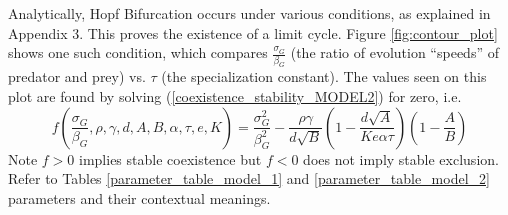 \documentclass{amsart}
\theoremstyle{definition}
\theoremstyle{remark}
\numberwithin{equation}{section}
\begin{document}
Analytically, Hopf Bifurcation occurs under various conditions, as explained in Appendix 3.  This proves the existence of a limit cycle.  Figure \ref{fig:contour_plot} shows one such condition, which compares $\frac{\sigma_G}{\beta_G}$ (the ratio of evolution ``speeds'' of predator and prey) vs. $\tau$ (the specialization constant).  The values seen on this plot are found by solving (\ref{coexistence_stability_MODEL2}) for zero, i.e.
\begin{equation}
	f\left(\frac{\sigma_G}{\beta_G}, \rho, \gamma, d, A, B, \alpha, \tau, e, K\right) = \frac{\sigma_G^2}{\beta_G^2} - \frac{\rho\gamma}{d\sqrt{B}}\left(1 - \frac{d\sqrt{A}}{Ke\alpha\tau}\right)\left(1 - \frac{A}{B}\right)
\end{equation}
Note $f > 0$ implies stable coexistence but $f < 0$ does not imply stable exclusion.
Refer to Tables \ref{parameter_table_model_1} and \ref{parameter_table_model_2} parameters and their contextual meanings.
\end{document}
